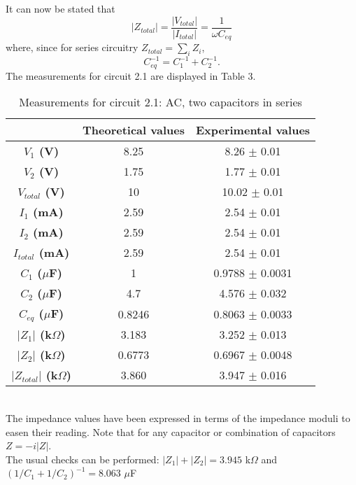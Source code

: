 \documentclass[a4paper, 12pt]{article}
\begin{document}
It can now be stated that
\begin{equation}\label{key}
	|Z_{total}| = \frac{|V_{total}|}{|I_{total}|}= \frac{1}{\omega C_{eq}}
\end{equation}
where, since for series circuitry $Z_{total} = \sum_i Z_i$,
\begin{equation}\label{ceq1}
	C_{eq}^{-1} = C_1^{-1} + C_2^{-1}.
\end{equation}
The measurements for circuit 2.1 are displayed in Table 3. 
\begin{table}[hbt!]
	\centering
	\begin{tabular}{|c|c|c|}
		\hline
		& \textbf{Theoretical values} & \textbf{Experimental values} \\
		\hline
		\textbf{$V_{1}$ (V)} & 8.25 & 8.26 $\pm$ 0.01 \\
		\textbf{$V_{2}$ (V)} & 1.75 & 1.77 $\pm$ 0.01 \\
		\textbf{$V_{total}$ (V)} & 10 & 10.02 $\pm$ 0.01\\
		\hline
		\textbf{$I_{1}$ (mA)} & 2.59  & 2.54 $\pm$ 0.01 \\
		\textbf{$I_{2}$ (mA)} & 2.59 & 2.54 $\pm$ 0.01 \\
		\textbf{$I_{total}$ (mA)} & 2.59 & 2.54 $\pm$ 0.01 \\
		\hline
		\textbf{$C_{1}$ ($\mu$F)} & 1 & 0.9788 $\pm$ 0.0031 \\
		\textbf{$C_{2}$ ($\mu$F)} & 4.7 & 4.576 $\pm$ 0.032 \\
		\textbf{$C_{eq}$ ($\mu$F)} & 0.8246 & 0.8063 $\pm$ 0.0033 \\
		\hline
		\textbf{$|Z_{1}|$ (k$\Omega$)} & 3.183 & 3.252 $\pm$ 0.013 \\
		\textbf{$|Z_{2}|$ (k$\Omega$)} & 0.6773 & 0.6967 $\pm$ 0.0048 \\
		\textbf{$|Z_{total}|$ (k$\Omega$)} & 3.860 & 	3.947 $\pm$ 0.016 \\
		\hline
	\end{tabular}
	\caption{Measurements for circuit 2.1: AC, two capacitors in series}
\end{table}\\

The impedance values have been expressed in terms of the impedance moduli to easen their reading. Note that for any capacitor or combination of capacitors $Z = -i|Z|$.\\

The usual checks can be performed: 
$|Z_1| + |Z_2| = 3.945 $ k$\Omega$ and $(1/C_1 + 1/C_2)^{-1} = 8.063 $ $\mu$F
\end{document}
